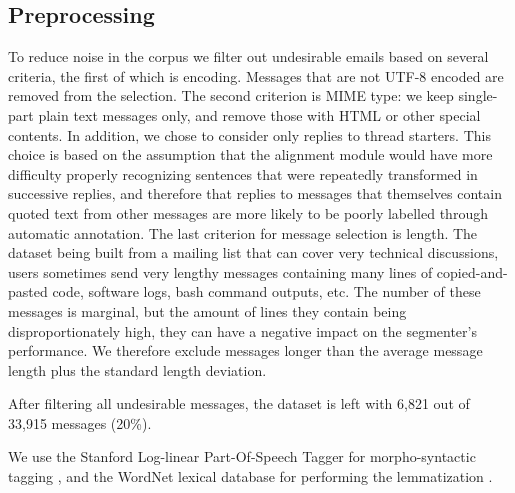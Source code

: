 \subsection{Preprocessing}

To reduce noise in the corpus we filter out undesirable emails based on several criteria, the first of which is encoding. Messages that are not UTF-8 encoded are removed from the selection. The second criterion is MIME type: we keep single-part plain text messages only, and remove those with HTML or other special contents.
%
In addition, we chose to consider only replies to thread starters. This choice is based on the assumption that the alignment module would have more difficulty properly recognizing sentences that were repeatedly transformed in successive replies, and therefore that replies to messages that themselves contain quoted text from other messages are more likely to be poorly labelled through automatic annotation.
%
The last criterion for message selection is length. The dataset being built from a mailing list that can cover very technical discussions, users sometimes send very lengthy messages containing many lines of copied-and-pasted code, software logs, bash command outputs, etc. The number of these messages is marginal, but the amount of lines they contain being disproportionately high, they can have a negative impact on the segmenter's performance. We therefore exclude messages longer than the average message length plus the standard length deviation.

After filtering all undesirable messages, the dataset is left with 6,821 out of 33,915 messages (20\%).

We use the Stanford Log-linear Part-Of-Speech Tagger for morpho-syntactic tagging \cite{toutanova2003feature}, and the WordNet lexical database for performing the lemmatization \cite{miller1995wordnet}.

